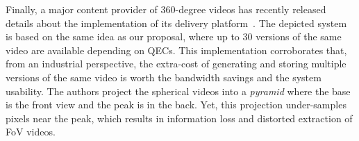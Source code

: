 Finally, a major content provider of 360-degree videos has recently released details about the
implementation of its delivery platform~\cite{facebook}. The depicted system is based
on the same idea as our proposal, where up to 30 versions of the same video are available depending on
\acp{QEC}. This implementation corroborates that, from an industrial perspective, the
extra-cost of
generating and storing multiple versions of the same video is worth the bandwidth
savings and the system usability. The authors project the spherical videos into a \emph{pyramid}
where the
base is the front
view and the peak is in the back. Yet, this projection under-samples pixels near the peak,
which
results in
information loss and distorted extraction of \ac{FoV} videos. 

%
%
%
%


